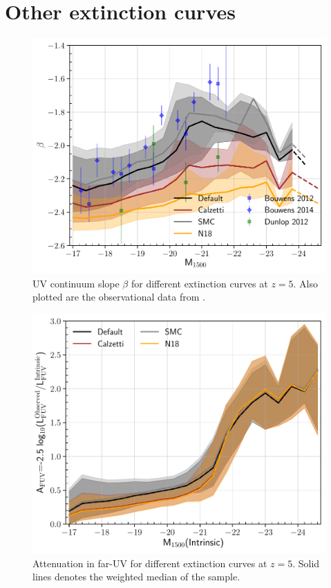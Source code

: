 \section{Other extinction curves}\label{app:extinction_curves}
\begin{figure}
	\centering
	\includegraphics[width=\columnwidth]{./figures/App_beta_Extcurves}
	\caption{UV continuum slope $\beta$ for different extinction curves at $z=5$. Also plotted are the observational data from \protect\cite{Dunlop2012,Bouwens2012b,Bouwens2014a}. \label{fig: ext curves beta}}
\end{figure}
\begin{figure}
	\centering
	\includegraphics[width=\columnwidth]{./figures/App_Att_Extcurves}
	\caption{Attenuation in far-UV for different extinction curves at $z=5$. Solid lines denotes the weighted median of the sample.\label{fig: ext curves att}}
\end{figure}
